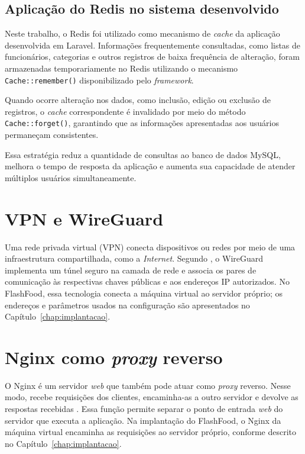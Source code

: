 \subsection{Aplicação do Redis no sistema desenvolvido}

Neste trabalho, o Redis foi utilizado como mecanismo de \textit{cache} da aplicação desenvolvida em Laravel. Informações frequentemente consultadas, como listas de funcionários, categorias e outros registros de baixa frequência de alteração, foram armazenadas temporariamente no Redis utilizando o mecanismo \texttt{Cache::remember()} disponibilizado pelo \textit{framework}.

Quando ocorre alteração nos dados, como inclusão, edição ou exclusão de registros, o \textit{cache} correspondente é invalidado por meio do método \texttt{Cache::forget()}, garantindo que as informações apresentadas aos usuários permaneçam consistentes.

Essa estratégia reduz a quantidade de consultas ao banco de dados MySQL, melhora o tempo de resposta da aplicação e aumenta sua capacidade de atender múltiplos usuários simultaneamente.   

\section{VPN e WireGuard}

Uma rede privada virtual (VPN) conecta dispositivos ou redes por meio de uma infraestrutura compartilhada, como a \textit{Internet}. Segundo , o WireGuard implementa um túnel seguro na camada de rede e associa os pares de comunicação às respectivas chaves públicas e aos endereços IP autorizados. No FlashFood, essa tecnologia conecta a máquina virtual ao servidor próprio; os endereços e parâmetros usados na configuração são apresentados no Capítulo~\ref{chap:implantacao}.

\section{Nginx como \textit{proxy} reverso}

O Nginx é um servidor \textit{web} que também pode atuar como \textit{proxy} reverso. Nesse modo, recebe requisições dos clientes, encaminha-as a outro servidor e devolve as respostas recebidas \cite{nginxBeginnersGuide}. Essa função permite separar o ponto de entrada \textit{web} do servidor que executa a aplicação. Na implantação do FlashFood, o Nginx da máquina virtual encaminha as requisições ao servidor próprio, conforme descrito no Capítulo~\ref{chap:implantacao}.
